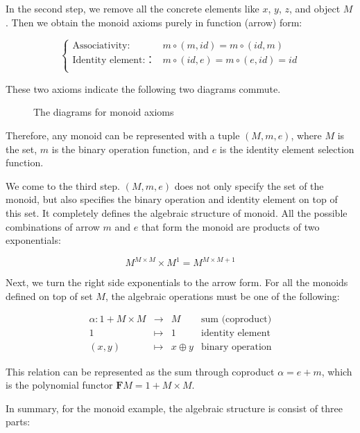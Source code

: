 \documentclass[b5paper]{article}
\begin{document}
\begin{example}
In the second step, we remove all the concrete elements like $x$, $y$, $z$, and object $M$. Then we obtain the monoid axioms purely in function (arrow) form:

\[
\begin{cases}
\text{Associativity:} & m \circ (m, id) = m \circ (id, m) \\
\text{Identity element:：} & m \circ (id, e) = m \circ (e, id) = id \\
\end{cases}
\]

These two axioms indicate the following two diagrams commute.

\begin{figure}[htbp]
\centering
{}
\quad
{}
\caption{The diagrams for monoid axioms}
\end{figure}

Therefore, any monoid can be represented with a tuple $(M, m , e)$, where $M$ is the set, $m$ is the binary operation function, and $e$ is the identity element selection function.

We come to the third step. $(M, m, e)$ does not only specify the set of the monoid, but also specifies the binary operation and identity element on top of this set. It completely defines the algebraic structure of monoid. All the possible combinations of arrow $m$ and $e$ that form the monoid are products of two exponentials:

\[
M^{M \times M} \times M^1 = M^{M \times M + 1}
\]

Next, we turn the right side exponentials to the arrow form. For all the monoids defined on top of set $M$, the algebraic operations must be one of the following:

\[
\begin{array}{rcll}
\alpha : 1 + M \times M & \longrightarrow & M & \text{sum (coproduct)}\\
1 & \longmapsto & 1 & \text{identity element}  \\
(x, y) & \longmapsto & x \oplus y & \text{binary operation}
\end{array}
\]

This relation can be represented as the sum through coproduct $\alpha = e + m$, which is the polynomial functor $\mathbf{F} M = 1 + M \times M$.

In summary, for the monoid example, the algebraic structure is consist of three parts:


\end{example}
\end{document}
